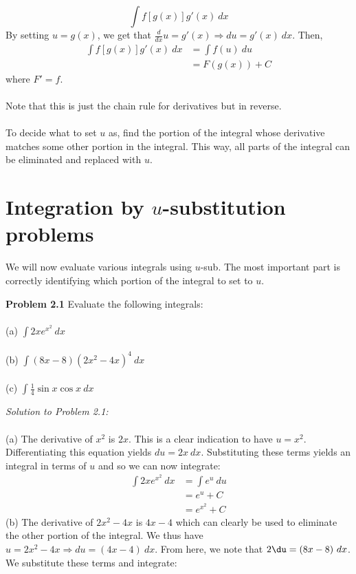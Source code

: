 \documentclass[11pt]{scrartcl}
\begin{document}
$$\int f[g(x)]g'(x) \ dx$$
\noindent 
By setting $u=g(x)$, we get that $\frac{d}{dx}u=g'(x) \Rightarrow du=g'(x)
 \ dx$. Then, 
 \begin{align*}
\int f[g(x)]g'(x) \ dx &= \int{f(u) \ du} \\
                       &= F(g(x)) + C
 \end{align*}
 \noindent 
where $F'=f$. \\
\\
\noindent
Note that this is just the chain rule for derivatives but in reverse.\\
\\
\noindent 
To decide what to set $u$ as, find the portion of the integral whose derivative matches some other portion in the integral. This way, all parts of the integral can be eliminated and replaced with $u$. 
\section{Integration by $u$-substitution problems}
We will now evaluate various integrals using $u$-sub. The most important part is correctly identifying which portion of the integral to set to $u$. 
\begin{tcolorbox}[colback=purple!5!white,colframe=purple!75!black]
\textbf{Problem 2.1} Evaluate the following integrals: \\
\\
\noindent 
(a) $\int 2xe^{x^2} \ dx$\\
\\
\noindent 
(b) $\int (8x-8)(2x^2-4x)^4 \ dx$ \\
\\
\noindent 
(c) $\int \frac{1}{4} \sin x \cos x \ dx$
\end{tcolorbox}
\noindent 
\textit{Solution to Problem 2.1:} \\
\\
\noindent 
(a) The derivative of $x^2$ is $2x$. This is a clear indication to have $u=x^2$. Differentiating this equation yields $du=2x \ dx$. Substituting these terms yields an integral in terms of $u$ and so we can now integrate: 
\begin{align*}
    \int 2xe^{x^2} \ dx &=\int e^u \ du \\
                        &=e^u+C \\
                        &=e^{x^2}+C
\end{align*} 
(b) The derivative of $2x^2-4x$ is $4x-4$ which can clearly be used to eliminate the other portion of the integral. We thus have $u=2x^2-4x \Rightarrow du=(4x-4) \ dx$. From here, we note that $2 \du=(8x-8) \ dx$. We substitute these terms and integrate: 
\end{document}
